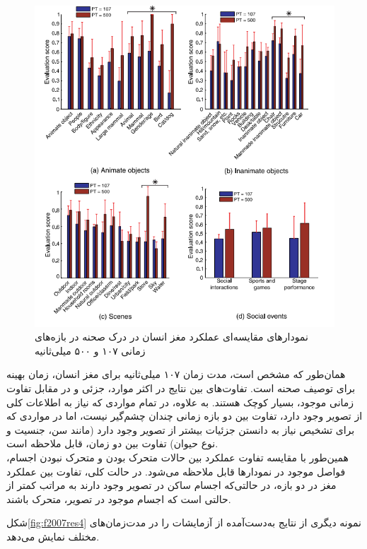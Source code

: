 \begin{enumerate}
\begin{figure}[H]
\center
\includegraphics[scale=0.6]{./Imgs/fei2007we_res3.png}
\caption[نمودار مقایسه‌ای عملکرد مغز در درک صحنه]{نمودارهای مقایسه‌ای عملکرد مغز انسان در درک صحنه در بازه‌های زمانی ۱۰۷ و ۵۰۰ میلی‌ثانیه\cite{fei2007we}}
\label{fig:f2007res3}
\end{figure}

همان‌طور که مشخص است، مدت زمان ۱۰۷ میلی‌ثانیه برای مغز انسان، زمان بهینه برای توصیف صحنه است. تفاوت‌های بین نتایج در اکثر موارد، جزئی و در مقابل تفاوت زمانی موجود، بسیار کوچک هستند.
به علاوه، در تمام مواردی که نیاز به اطلاعات کلی از تصویر وجود دارد، تفاوت بین دو بازه زمانی چندان چشم‌گیر نیست، اما در مواردی که برای تشخیص نیاز به دانستن جزئیات بیشتر از تصویر وجود دارد (مانند سن، جنسیت و نوع حیوان) تفاوت بین دو زمان، قابل ملاحظه است.
\\
همین‌طور با مقایسه تفاوت عملکرد بین حالات متحرک بودن و متحرک نبودن اجسام، فواصل موجود در نمودارها قابل ملاحظه می‌شود. در حالت کلی، تفاوت بین عملکرد مغز در دو بازه، در حالتی‌که اجسام ساکن در تصویر وجود دارند به مراتب کمتر از حالتی است که اجسام موجود در تصویر، متحرک باشند.
\end{enumerate}

شکل\ref{fig:f2007res4} نمونه دیگری از نتایج به‌دست‌آمده از آزمایشات را در مدت‌زمان‌های مختلف نمایش ‌می‌دهد.



